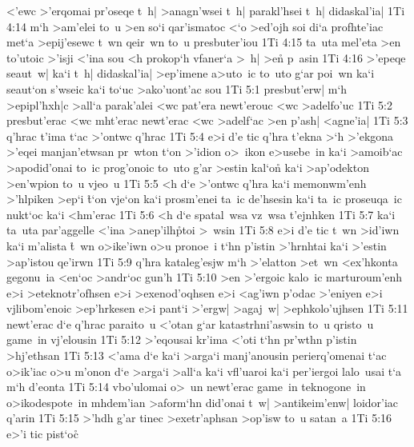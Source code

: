 <'ewc
>'erqomai
pr'oseqe
t~h|
>anagn'wsei
t~h|
parakl'hsei
t~h|
didaskal'ia|\bibvsend
\vs 1Ti 4:14
m`h
>am'elei
to~u
>en
so`i
qar'ismatoc
<`o
>ed'ojh
soi
di`a
profhte'iac
met`a
>epij'esewc
t~wn
qeir~wn
to~u
presbuter'iou\bibvsend
\vs 1Ti 4:15
ta~uta
mel'eta
>en
to'utoic
>'isji
<'ina
sou
<h
prokop`h
vfaner`a
>~h|
>e\r{n}
p~asin\bibvsend
\vs 1Ti 4:16
>'epeqe
seaut~w|
ka`i
t~h|
didaskal'ia|
>ep'imene
a>uto~ic
to~uto
g`ar
poi~wn
ka`i
seaut`on
s'wseic
ka`i
to`uc
>ako'uont'ac
sou\bibvsend
\vs 1Ti 5:1
presbut'erw|
m`h
>epipl'hxh|c
>all`a
parak'alei
<wc
pat'era
newt'erouc
<wc
>adelfo'uc\bibvsend
\vs 1Ti 5:2
presbut'erac
<wc
mht'erac
newt'erac
<wc
>adelf`ac
>en
p'ash|
<agne'ia|\bibvsend
\vs 1Ti 5:3
q'hrac
t'ima
t`ac
>'ontwc
q'hrac\bibvsend
\vs 1Ti 5:4
e>i
d'e
tic
q'hra
t'ekna
>`h
>'ekgona
>'eqei
manjan'etwsan
pr~wton
t`on
>'idion
o>~ikon
e>usebe~in
ka`i
>amoib`ac
>apodid'onai
to~ic
prog'onoic
to~uto
g'ar
>estin
kal`on\r{}
ka`i
>ap'odekton
>en'wpion
to~u
vjeo~u\bibvsend
\vs 1Ti 5:5
<h
d`e
>'ontwc
q'hra
ka`i
memonwm'enh
>'hlpiken
>ep`i
\r{t}`on
vje`on
ka`i
prosm'enei
ta~ic
de'hsesin
ka`i
ta~ic
proseuqa~ic
nukt`oc
ka`i
<hm'erac\bibvsend
\vs 1Ti 5:6
<h
d`e
spatal~wsa
vz~wsa
t'ejnhken\bibvsend
\vs 1Ti 5:7
ka`i
ta~uta
par'aggelle
<'ina
>anep'ilh\r{p}toi
>~wsin\bibvsend
\vs 1Ti 5:8
e>i
d'e
tic
t~wn
>id'iwn
ka`i
m'alista
\r{t}~wn
o>ike'iwn
o>u
pronoe~i
t`hn
p'istin
>'hrnhtai
ka`i
>'estin
>ap'istou
qe'irwn\bibvsend
\vs 1Ti 5:9
q'hra
kataleg'esjw
m`h
>'elatton
>et~wn
<ex'hkonta
gegonu~ia
<en`oc
>andr`oc
gun'h\bibvsend
\vs 1Ti 5:10
>en
>'ergoic
kalo~ic
marturoum'enh
e>i
>eteknotr'ofhsen
e>i
>exenod'oqhsen
e>i
<ag'iwn
p'odac
>'eniyen
e>i
vjlibom'enoic
>ep'hrkesen
e>i
pant`i
>'ergw|
>agaj~w|
>ephkolo'ujhsen\bibvsend
\vs 1Ti 5:11
newt'erac
d`e
q'hrac
paraito~u
<'otan
g`ar
katastrhni'aswsin
to~u
qristo~u
game~in
vj'elousin\bibvsend
\vs 1Ti 5:12
>'eqousai
kr'ima
<'oti
t`hn
pr'wthn
p'istin
>hj'ethsan\bibvsend
\vs 1Ti 5:13
<'ama
d`e
ka`i
>arga`i
manj'anousin
perierq'omenai
t`ac
o>ik'iac
o>u
m'onon
d`e
>arga`i
>all`a
ka`i
vfl'uaroi
ka`i
per'iergoi
lalo~usai
t`a
m`h
d'eonta\bibvsend
\vs 1Ti 5:14
vbo'ulomai
o>~un
newt'erac
game~in
teknogone~in
o>ikodespote~in
mhdem'ian
>aform`hn
did'onai
t~w|
>antikeim'enw|
loidor'iac
q'arin\bibvsend
\vs 1Ti 5:15
>'hdh
g'ar
tinec
>exetr'aphsan
>op'isw
to~u
satan~a\bibvsend
\vs 1Ti 5:16
e>'i
tic
pist`oc\r{}
